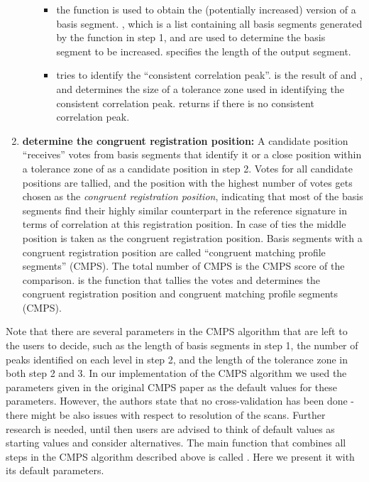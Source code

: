 \begin{enumerate}
\begin{itemize}
    \begin{itemize}
    \tightlist
    \item
      the function 
      is used to obtain the (potentially increased) version of a basis
      segment. , which is a list containing all basis
      segments generated by the function  in step
      1, and  are used to determine the basis segment to be
      increased.  specifies the length of the output
      segment.
    \item
       tries to identify the
      ``consistent correlation peak''.  is the result of
       and , and 
      determines the size of a tolerance zone used in identifying the
      consistent correlation peak.  returns
       if there is no consistent correlation peak.
    \end{itemize}
  \end{itemize}
\item
  \textbf{determine the congruent registration position:} A candidate
  position ``receives'' votes from basis segments that identify it or a
  close position within a tolerance zone of  as a candidate
  position in step 2. Votes for all candidate positions are tallied, and
  the position with the highest number of votes gets chosen as the
  \emph{congruent registration position}, indicating that most of the
  basis segments find their highly similar counterpart in the reference
  signature in terms of correlation at this registration position. In
  case of ties the middle position is taken as the congruent
  registration position. Basis segments with a congruent registration
  position are called ``congruent matching profile segments'' (CMPS).
  The total number of CMPS is the CMPS score of the comparison.
   is the function that tallies the
  votes and determines the congruent registration position and congruent
  matching profile segments (CMPS).
\end{enumerate}

Note that there are several parameters in the CMPS algorithm that are
left to the users to decide, such as the length of basis segments
 in step 1, the number of peaks 
identified on each level in step 2, and the length of the tolerance zone
 in both step 2 and 3. In our implementation of the CMPS
algorithm we used the parameters given in the original CMPS paper
\citep{cmps} as the default values for these parameters. However, the
authors state that no cross-validation has been done - there might be
also issues with respect to resolution of the scans. Further research is
needed, until then users are advised to think of default values as
starting values and consider alternatives. The main function that
combines all steps in the CMPS algorithm described above is called
. Here we present it with its default
parameters.

